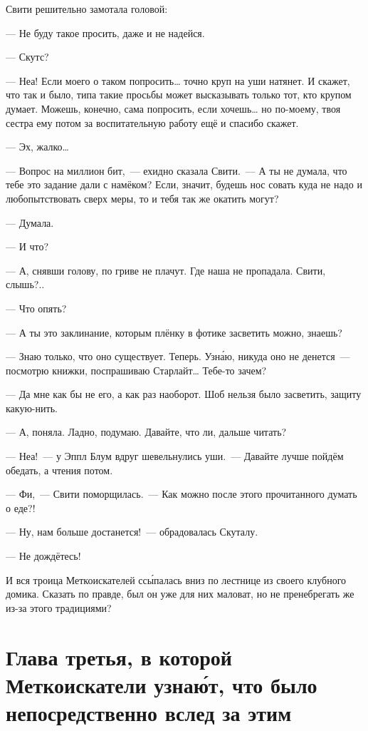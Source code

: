 \documentclass[fontsize=11pt,a5paper,titlepage=firstcover]{scrbook}
\begin{document}
Свити решительно замотала головой:

--- Не буду такое просить, даже и не надейся.

--- Скутс?

--- Неа! Если моего о таком попросить{\ldots} точно круп на уши натянет. И скажет, что так и было, типа такие просьбы может высказывать только тот, кто крупом думает. Можешь, конечно, сама попросить, если хочешь{\ldots} но по-моему, твоя сестра ему потом за воспитательную работу ещё и спасибо скажет.

--- Эх, жалко{\ldots}

--- Вопрос на миллион бит,~--- ехидно сказала Свити.~--- А ты не думала, что тебе это задание дали с намёком? Если, значит, будешь нос совать куда не надо и любопытствовать сверх меры, то и тебя так же окатить могут?

--- Думала.

--- И что?

--- А, снявши голову, по гриве не плачут. Где наша не пропадала. Свити, слышь?..

--- Что опять?

--- А ты это заклинание, которым плёнку в фотике засветить можно, знаешь?

--- Знаю только, что оно существует. Теперь. Узна́ю, никуда оно не денется~--- посмотрю книжки, поспрашиваю Старлайт{\ldots} Тебе-то зачем?

--- Да мне как бы не его, а как раз наоборот. Шоб нельзя было засветить, защиту какую-нить.

--- А, поняла. Ладно, подумаю. Давайте, что ли, дальше читать?

--- Неа!~--- у Эппл Блум вдруг шевельнулись уши.~--- Давайте лучше пойдём обедать, а чтения потом.

--- Фи,~--- Свити поморщилась.~--- Как можно после этого прочитанного думать о еде?!

--- Ну, нам больше достанется!~--- обрадовалась Скуталу.

--- Не дождётесь!

И вся троица Меткоискателей ссы́палась вниз по лестнице из своего клубного домика. Сказать по правде, был он уже для них маловат, но не пренебрегать же из-за этого традициями?


\chapter*{Глава третья, в которой Меткоискатели узнаю́т, что было непосредственно вслед за этим}
\end{document}
